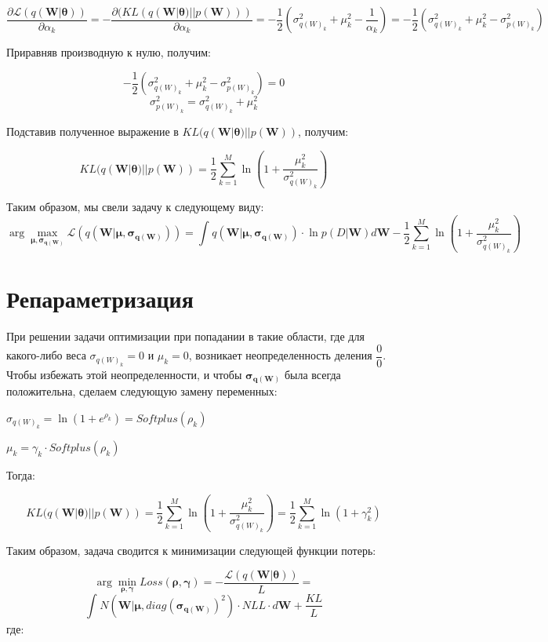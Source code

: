 \documentclass{article}
\newcommand{\argmin}{\arg\!\min}
\newcommand{\argmax}{\arg\!\max}
\begin{document}
\[
\dfrac{\partial \mathcal{L}(q(\mathbf{W} | \pmb{\theta}))}{\partial {\alpha_k}} =
- \dfrac{\partial (KL(q(\mathbf{W} | \pmb{\theta}) || p(\mathbf{W})))}{\partial {\alpha_k}} =
-\dfrac{1}{2}(\sigma_{{q(W)_{k}}}^2 + \mu_{k}^2 - \dfrac{1}{\alpha_k}) =
-\dfrac{1}{2}(\sigma_{{q(W)_{k}}}^2 + \mu_{k}^2 - \sigma_{{p(W)_{k}}}^2)
\]

Приравняв производную к нулю, получим:

\[
-\dfrac{1}{2}(\sigma_{{q(W)_{k}}}^2 + \mu_{k}^2 - \sigma_{{p(W)_{k}}}^2) = 0
\]
\[
\sigma_{{p(W)_{k}}}^2 = \sigma_{{q(W)_{k}}}^2 + \mu_{k}^2
\]

Подставив полученное выражение в $KL(q(\mathbf{W} | \pmb{\theta}) || p(\mathbf{W}))$, получим:

\[
KL(q(\mathbf{W} | \pmb{\theta}) || p(\mathbf{W})) =
\dfrac{1}{2}\sum_{k=1}^{M}\ln({1 + \dfrac{\mu_{k}^2}{\sigma_{{q(W)_{k}}}^2}})
\]

Таким образом, мы свели задачу к следующему виду:
\[
\argmax_{\pmb{\mu}, \pmb{\sigma_{q(\mathbf{W})}}} \mathcal{L}(q(\mathbf{W} | \pmb{\mu}, \pmb{\sigma_{q(\mathbf{W})}})) =
\int_{}{} q(\mathbf{W} | \pmb{\mu}, \pmb{\sigma_{q(\mathbf{W})}}) \cdot \ln{p(D | \mathbf{W})} d\mathbf{W} - \dfrac{1}{2}\sum_{k=1}^{M}\ln({1 + \dfrac{\mu_{k}^2}{\sigma_{{q(W)_{k}}}^2}})
\]

\section{Репараметризация}

При решении задачи оптимизации при попадании в такие области, где для какого-либо веса $\sigma_{{q(W)_{k}}} = 0$ и $\mu_{k} = 0$, возникает неопределенность деления $\dfrac{0}{0}$. Чтобы избежать этой неопределенности, и чтобы $\pmb{\sigma_{q(\mathbf{W})}}$ была всегда положительна, сделаем следующую замену переменных:

$\sigma_{{q(W)_{k}}} = \ln({1 + e^{\rho_{k}}}) = Softplus(\rho_{k})$

$\mu_{k} = \gamma_{k} \cdot Softplus(\rho_{k})$

Тогда:

\[
KL(q(\mathbf{W} | \pmb{\theta}) || p(\mathbf{W})) =
\dfrac{1}{2}\sum_{k=1}^{M}\ln({1 + \dfrac{\mu_{k}^2}{\sigma_{{q(W)_{k}}}^2}}) =
\dfrac{1}{2}\sum_{k=1}^{M}\ln({1 + \gamma_{k}^{2}})
\]

Таким образом, задача сводится к минимизации следующей функции потерь:

\[
\argmin_{\pmb{\rho}, \pmb{\gamma}} Loss(\pmb{\rho}, \pmb{\gamma}) =
- \dfrac{\mathcal{L}(q(\mathbf{W} | \pmb{\theta}))}{L} =
\]\[
\int_{}{} N(\mathbf{W} | \pmb{\mu}, diag(\pmb{\sigma_{q(\mathbf{W})}})^{2}) \cdot NLL \cdot d\mathbf{W} + \dfrac{KL}{L}
\] где:
\end{document}
